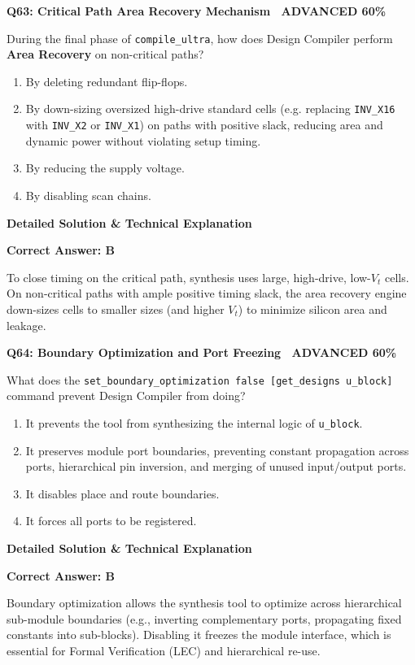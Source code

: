 \documentclass[11pt,a4paper]{article}
\newcommand{\badgeadv}{{\color{white}\colorbox{advred}{\bfseries\sffamily\tiny\ ADVANCED 60\%\ }}}
\newenvironment{qbox}[2]{%
  \begin{mdframed}[style=qstyle]%
  {\bfseries\sffamily\color{primaryblue}#1 \hfill #2}\par\vspace{2pt}%
}{%
  \end{mdframed}%
}
\newenvironment{ansbox}{%
  \begin{mdframed}[style=ansstyle]%
  {\bfseries\sffamily\color{ansgreen}\small Detailed Solution \& Technical Explanation}\par\vspace{2pt}\small%
}{%
  \end{mdframed}%
}
\begin{document}
\begin{qbox}{Q63: Critical Path Area Recovery Mechanism}{\badgeadv}
During the final phase of \texttt{compile\_ultra}, how does Design Compiler perform \textbf{Area Recovery} on non-critical paths?
\begin{enumerate}[label=\textbf{\Alph*.}]
  \item By deleting redundant flip-flops.
  \item By down-sizing oversized high-drive standard cells (e.g. replacing \texttt{INV\_X16} with \texttt{INV\_X2} or \texttt{INV\_X1}) on paths with positive slack, reducing area and dynamic power without violating setup timing.
  \item By reducing the supply voltage.
  \item By disabling scan chains.
\end{enumerate}
\end{qbox}
\begin{ansbox}
\textbf{Correct Answer: B}

To close timing on the critical path, synthesis uses large, high-drive, low-$V_t$ cells. On non-critical paths with ample positive timing slack, the area recovery engine down-sizes cells to smaller sizes (and higher $V_t$) to minimize silicon area and leakage.
\end{ansbox}

\begin{qbox}{Q64: Boundary Optimization and Port Freezing}{\badgeadv}
What does the \texttt{set\_boundary\_optimization false [get\_designs u\_block]} command prevent Design Compiler from doing?
\begin{enumerate}[label=\textbf{\Alph*.}]
  \item It prevents the tool from synthesizing the internal logic of \texttt{u\_block}.
  \item It preserves module port boundaries, preventing constant propagation across ports, hierarchical pin inversion, and merging of unused input/output ports.
  \item It disables place and route boundaries.
  \item It forces all ports to be registered.
\end{enumerate}
\end{qbox}
\begin{ansbox}
\textbf{Correct Answer: B}

Boundary optimization allows the synthesis tool to optimize across hierarchical sub-module boundaries (e.g., inverting complementary ports, propagating fixed constants into sub-blocks). Disabling it freezes the module interface, which is essential for Formal Verification (LEC) and hierarchical re-use.
\end{ansbox}
\end{document}
